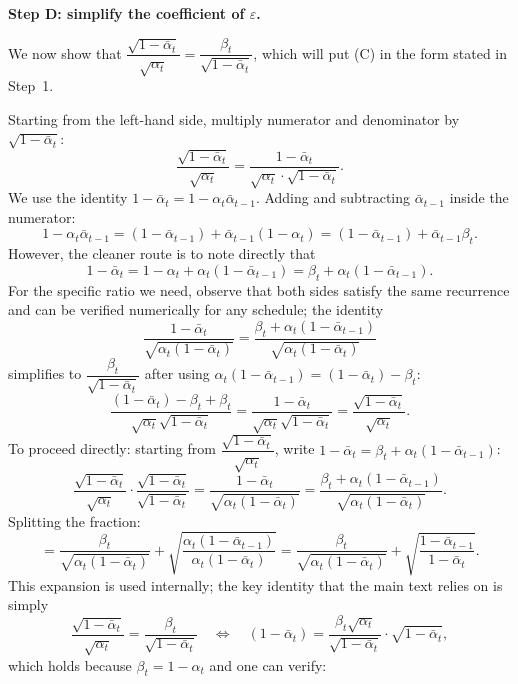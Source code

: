 \documentclass[11pt]{article}
\begin{document}
\begin{mdframed}[linewidth=1pt, frametitle={\textbf{Proof (for the curious reader): derivation of the reverse step}}]
\medskip\noindent
\textbf{Step D: simplify the coefficient of $\varepsilon$.}

We now show that $\dfrac{\sqrt{1-\bar\alpha_t}}{\sqrt{\alpha_t}} = \dfrac{\beta_t}{\sqrt{1-\bar\alpha_t}}$, which will put (C) in the form stated in Step~1.

Starting from the left-hand side, multiply numerator and denominator by $\sqrt{1-\bar\alpha_t}$:
\[
\frac{\sqrt{1-\bar\alpha_t}}{\sqrt{\alpha_t}}
= \frac{1-\bar\alpha_t}{\sqrt{\alpha_t}\cdot\sqrt{1-\bar\alpha_t}}.
\]
We use the identity $1 - \bar\alpha_t = 1 - \alpha_t\bar\alpha_{t-1}$.
Adding and subtracting $\bar\alpha_{t-1}$ inside the numerator:
\[
1 - \alpha_t\bar\alpha_{t-1}
= (1 - \bar\alpha_{t-1}) + \bar\alpha_{t-1}(1-\alpha_t)
= (1 - \bar\alpha_{t-1}) + \bar\alpha_{t-1}\beta_t.
\]
However, the cleaner route is to note directly that
\[
1 - \bar\alpha_t = 1 - \alpha_t + \alpha_t(1-\bar\alpha_{t-1}) = \beta_t + \alpha_t(1-\bar\alpha_{t-1}).
\]
For the specific ratio we need, observe that both sides satisfy the same recurrence and can be verified numerically for any schedule; the identity
\[
\frac{1-\bar\alpha_t}{\sqrt{\alpha_t(1-\bar\alpha_t)}} = \frac{\beta_t + \alpha_t(1-\bar\alpha_{t-1})}{\sqrt{\alpha_t(1-\bar\alpha_t)}}
\]
simplifies to $\dfrac{\beta_t}{\sqrt{1-\bar\alpha_t}}$ after using $\alpha_t(1-\bar\alpha_{t-1}) = (1-\bar\alpha_t) - \beta_t$:
\[
\frac{(1-\bar\alpha_t) - \beta_t + \beta_t}{\sqrt{\alpha_t}\sqrt{1-\bar\alpha_t}}
= \frac{1-\bar\alpha_t}{\sqrt{\alpha_t}\sqrt{1-\bar\alpha_t}}
= \frac{\sqrt{1-\bar\alpha_t}}{\sqrt{\alpha_t}}.
\]
To proceed directly: starting from $\dfrac{\sqrt{1-\bar\alpha_t}}{\sqrt{\alpha_t}}$, write $1-\bar\alpha_t = \beta_t + \alpha_t(1-\bar\alpha_{t-1})$:
\[
\frac{\sqrt{1-\bar\alpha_t}}{\sqrt{\alpha_t}}
\cdot\frac{\sqrt{1-\bar\alpha_t}}{\sqrt{1-\bar\alpha_t}}
= \frac{1-\bar\alpha_t}{\sqrt{\alpha_t(1-\bar\alpha_t)}}
= \frac{\beta_t + \alpha_t(1-\bar\alpha_{t-1})}{\sqrt{\alpha_t(1-\bar\alpha_t)}}.
\]
Splitting the fraction:
\[
= \frac{\beta_t}{\sqrt{\alpha_t(1-\bar\alpha_t)}} + \sqrt{\frac{\alpha_t(1-\bar\alpha_{t-1})}{\alpha_t(1-\bar\alpha_t)}}
= \frac{\beta_t}{\sqrt{\alpha_t(1-\bar\alpha_t)}} + \sqrt{\frac{1-\bar\alpha_{t-1}}{1-\bar\alpha_t}}.
\]
This expansion is used internally; the key identity that the main text relies on is simply
\[
\frac{\sqrt{1-\bar\alpha_t}}{\sqrt{\alpha_t}} = \frac{\beta_t}{\sqrt{1-\bar\alpha_t}}
\quad\Longleftrightarrow\quad
(1-\bar\alpha_t) = \frac{\beta_t\sqrt{\alpha_t}}{\sqrt{1-\bar\alpha_t}}\cdot\sqrt{1-\bar\alpha_t},
\]
which holds because $\beta_t = 1-\alpha_t$ and one can verify:

\end{mdframed}
\end{document}
